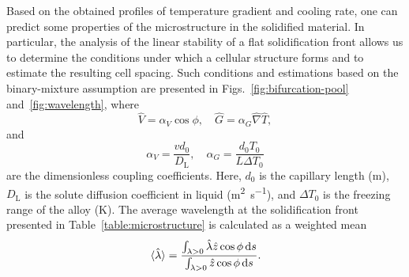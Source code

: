 \documentclass{article}
\newcommand{\liq}{\text{L}}
\begin{document}
Based on the obtained profiles of temperature gradient and cooling rate,
one can predict some properties of the microstructure in the solidified material.
In particular, the analysis of the linear stability of a flat solidification front allows us
to determine the conditions under which a cellular structure forms and to estimate the resulting cell spacing.
Such conditions and estimations based on the binary-mixture assumption are presented
in Figs.~\ref{fig:bifurcation-pool} and~\ref{fig:wavelength}, where
\begin{equation}\label{eq:hatVG}
    \hat{V} = \alpha_V\cos\phi, \quad \hat{G} = \alpha_G\hat\nabla\hat{T},
\end{equation}
and
\begin{equation}\label{eq:alphaVG}
    \alpha_V = \frac{vd_0}{D_\liq}, \quad \alpha_G = \frac{d_0T_0}{L\Delta{T}_0}
\end{equation}
are the dimensionless coupling coefficients.
Here, $d_0$ is the capillary length (\si{\m}),
$D_\liq$ is the solute diffusion coefficient in liquid (\si{\m\squared\per\s}),
and $\Delta{T}_0$ is the freezing range of the alloy (\si{\K}).
The average wavelength at the solidification front presented in Table~\ref{table:microstructure}
is calculated as a weighted mean
\begin{equation}\label{eq:mean_wavelength}
    \ev*{\hat\lambda} = \frac{\int_{\lambda>0}\hat\lambda\hat{z}\cos\phi\dd{s}}{\int_{\lambda>0}\hat{z}\cos\phi\dd{s}}.
\end{equation}

\printbibliography
\end{document}
